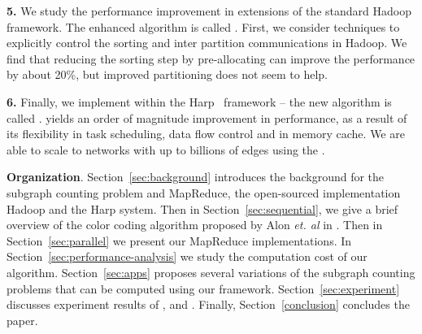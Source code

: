 \smallskip
\textbf{5.}  We study the performance improvement in extensions of the standard
Hadoop framework. The enhanced algorithm is called \ensahad{}.
First, we consider techniques to explicitly
control the sorting and inter partition communications in Hadoop. We find
that reducing the sorting step by pre-allocating can improve the
performance by about 20\%, but improved partitioning does not seem to help.


\smallskip
\textbf{6.} Finally, we implement \sahad{} within the Harp~\cite{qiu2014towards} framework
-- the new algorithm is called \harpsahad{}. \harpsahad{}
yields an order of magnitude improvement in performance, as a result of
its flexibility in task scheduling, data flow control and in memory cache. We
are able to scale to networks with up to billions of edges using the
\harpsahad{}. 





\noindent
\textbf{Organization}.
Section~\ref{sec:background} introduces the background for the subgraph counting
problem and MapReduce, the open-sourced implementation Hadoop and the Harp
system. Then in Section~\ref{sec:sequential}, we give a brief overview of the
color coding algorithm proposed by Alon \emph{et. al} in
\cite{alon2008biomolecular}. Then in Section~\ref{sec:parallel} we present our
MapReduce implementations. In Section~\ref{sec:performance-analysis} we study
the computation cost of our algorithm. Section~\ref{sec:apps} proposes several
variations of the subgraph counting problems that can be computed using our
framework. Section~\ref{sec:experiment} discusses experiment results of
\sahad{}, \ensahad{} and \harpsahad{}. Finally, Section~\ref{conclusion}
concludes the paper.

